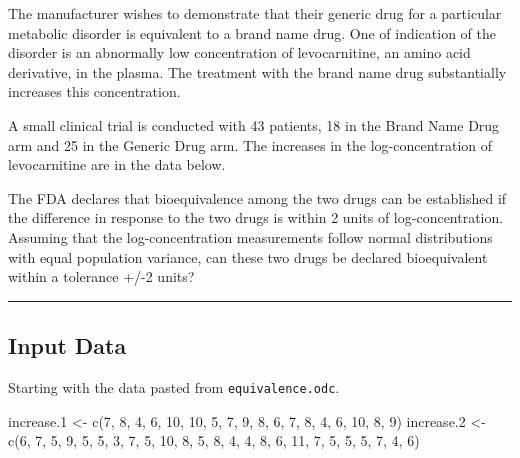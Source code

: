\documentclass[
  letterpaper,
  DIV=11,
  numbers=noendperiod]{scrreprt}
\newenvironment{Shaded}{\begin{snugshade}}{\end{snugshade}}
\newcommand{\DecValTok}[1]{\textcolor[rgb]{0.68,0.00,0.00}{#1}}
\newcommand{\FloatTok}[1]{\textcolor[rgb]{0.68,0.00,0.00}{#1}}
\newcommand{\FunctionTok}[1]{\textcolor[rgb]{0.28,0.35,0.67}{#1}}
\newcommand{\NormalTok}[1]{\textcolor[rgb]{0.00,0.23,0.31}{#1}}
\newcommand{\OtherTok}[1]{\textcolor[rgb]{0.00,0.23,0.31}{#1}}
\begin{document}

The manufacturer wishes to demonstrate that their generic drug for a
particular metabolic disorder is equivalent to a brand name drug. One of
indication of the disorder is an abnormally low concentration of
levocarnitine, an amino acid derivative, in the plasma. The treatment
with the brand name drug substantially increases this concentration.

A small clinical trial is conducted with 43 patients, 18 in the Brand
Name Drug arm and 25 in the Generic Drug arm. The increases in the
log-concentration of levocarnitine are in the data below.

The FDA declares that bioequivalence among the two drugs can be
established if the difference in response to the two drugs is within 2
units of log-concentration. Assuming that the log-concentration
measurements follow normal distributions with equal population variance,
can these two drugs be declared bioequivalent within a tolerance +/-2
units?

\begin{center}\rule{0.5\linewidth}{0.5pt}\end{center}

\hypertarget{input-data-1}{%
\subsection*{Input Data}\label{input-data-1}}

Starting with the data pasted from \texttt{equivalence.odc}.

\begin{Shaded}
\begin{Highlighting}[]
\NormalTok{increase}\FloatTok{.1} \OtherTok{\textless{}{-}} \FunctionTok{c}\NormalTok{(}\DecValTok{7}\NormalTok{, }\DecValTok{8}\NormalTok{, }\DecValTok{4}\NormalTok{, }\DecValTok{6}\NormalTok{, }\DecValTok{10}\NormalTok{, }\DecValTok{10}\NormalTok{, }\DecValTok{5}\NormalTok{, }\DecValTok{7}\NormalTok{, }\DecValTok{9}\NormalTok{, }\DecValTok{8}\NormalTok{, }\DecValTok{6}\NormalTok{, }\DecValTok{7}\NormalTok{, }\DecValTok{8}\NormalTok{, }\DecValTok{4}\NormalTok{, }\DecValTok{6}\NormalTok{, }\DecValTok{10}\NormalTok{, }\DecValTok{8}\NormalTok{, }\DecValTok{9}\NormalTok{)}
\NormalTok{increase}\FloatTok{.2} \OtherTok{\textless{}{-}} \FunctionTok{c}\NormalTok{(}\DecValTok{6}\NormalTok{, }\DecValTok{7}\NormalTok{, }\DecValTok{5}\NormalTok{, }\DecValTok{9}\NormalTok{, }\DecValTok{5}\NormalTok{, }\DecValTok{5}\NormalTok{, }\DecValTok{3}\NormalTok{, }\DecValTok{7}\NormalTok{, }\DecValTok{5}\NormalTok{, }\DecValTok{10}\NormalTok{, }\DecValTok{8}\NormalTok{, }\DecValTok{5}\NormalTok{, }\DecValTok{8}\NormalTok{, }\DecValTok{4}\NormalTok{, }\DecValTok{4}\NormalTok{, }\DecValTok{8}\NormalTok{, }\DecValTok{6}\NormalTok{, }\DecValTok{11}\NormalTok{, }\DecValTok{7}\NormalTok{, }\DecValTok{5}\NormalTok{, }\DecValTok{5}\NormalTok{, }\DecValTok{5}\NormalTok{, }\DecValTok{7}\NormalTok{, }\DecValTok{4}\NormalTok{, }\DecValTok{6}\NormalTok{)}
\end{Highlighting}
\end{Shaded}
\end{document}
